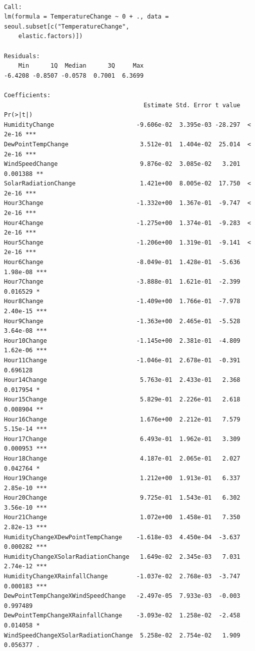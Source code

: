 \documentclass[
  letterpaper,
  DIV=11,
  numbers=noendperiod]{scrartcl}
\begin{document}
\begin{verbatim}

Call:
lm(formula = TemperatureChange ~ 0 + ., data = seoul.subset[c("TemperatureChange", 
    elastic.factors)])

Residuals:
    Min      1Q  Median      3Q     Max 
-6.4208 -0.8507 -0.0578  0.7001  6.3699 

Coefficients:
                                       Estimate Std. Error t value Pr(>|t|)    
HumidityChange                       -9.606e-02  3.395e-03 -28.297  < 2e-16 ***
DewPointTempChange                    3.512e-01  1.404e-02  25.014  < 2e-16 ***
WindSpeedChange                       9.876e-02  3.085e-02   3.201 0.001388 ** 
SolarRadiationChange                  1.421e+00  8.005e-02  17.750  < 2e-16 ***
Hour3Change                          -1.332e+00  1.367e-01  -9.747  < 2e-16 ***
Hour4Change                          -1.275e+00  1.374e-01  -9.283  < 2e-16 ***
Hour5Change                          -1.206e+00  1.319e-01  -9.141  < 2e-16 ***
Hour6Change                          -8.049e-01  1.428e-01  -5.636 1.98e-08 ***
Hour7Change                          -3.888e-01  1.621e-01  -2.399 0.016529 *  
Hour8Change                          -1.409e+00  1.766e-01  -7.978 2.40e-15 ***
Hour9Change                          -1.363e+00  2.465e-01  -5.528 3.64e-08 ***
Hour10Change                         -1.145e+00  2.381e-01  -4.809 1.62e-06 ***
Hour11Change                         -1.046e-01  2.678e-01  -0.391 0.696128    
Hour14Change                          5.763e-01  2.433e-01   2.368 0.017954 *  
Hour15Change                          5.829e-01  2.226e-01   2.618 0.008904 ** 
Hour16Change                          1.676e+00  2.212e-01   7.579 5.15e-14 ***
Hour17Change                          6.493e-01  1.962e-01   3.309 0.000953 ***
Hour18Change                          4.187e-01  2.065e-01   2.027 0.042764 *  
Hour19Change                          1.212e+00  1.913e-01   6.337 2.85e-10 ***
Hour20Change                          9.725e-01  1.543e-01   6.302 3.56e-10 ***
Hour21Change                          1.072e+00  1.458e-01   7.350 2.82e-13 ***
HumidityChangeXDewPointTempChange    -1.618e-03  4.450e-04  -3.637 0.000282 ***
HumidityChangeXSolarRadiationChange   1.649e-02  2.345e-03   7.031 2.74e-12 ***
HumidityChangeXRainfallChange        -1.037e-02  2.768e-03  -3.747 0.000183 ***
DewPointTempChangeXWindSpeedChange   -2.497e-05  7.933e-03  -0.003 0.997489    
DewPointTempChangeXRainfallChange    -3.093e-02  1.258e-02  -2.458 0.014058 *  
WindSpeedChangeXSolarRadiationChange  5.258e-02  2.754e-02   1.909 0.056377 .  

\end{verbatim}
\end{document}
